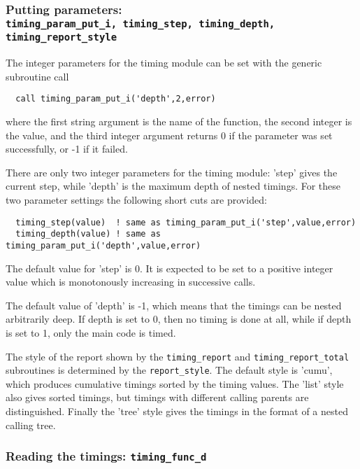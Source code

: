 \subsubsection{Putting parameters: \\
{\tt timing\_param\_put\_i, timing\_step, timing\_depth, 
timing\_report\_style}}

The integer parameters for the timing module can be set with the generic
subroutine call
\begin{verbatim}
  call timing_param_put_i('depth',2,error)
\end{verbatim}
where the first string argument is the name of the function,
the second integer is the value, and the third integer argument
returns 0 if the parameter was set successfully, or -1 if it failed.

There are only two integer parameters for the timing module:
'step' gives the current step, while 'depth' is the maximum
depth of nested timings. For these two parameter settings the 
following short cuts are provided:
{\small
\begin{verbatim}
  timing_step(value)  ! same as timing_param_put_i('step',value,error)
  timing_depth(value) ! same as timing_param_put_i('depth',value,error)
\end{verbatim}
}
The default value for 'step' is 0. It is expected to be set to
a positive integer value which is monotonously increasing in
successive calls.

The default value of 'depth' is -1, which 
means that the timings can be nested arbitrarily deep. 
If depth is set to 0, then no timing is done at all, while
if depth is set to 1, only the main code is timed.

The style of the report shown by the 
{\tt timing\_report} and  {\tt timing\_report\_total} subroutines
is determined by the {\tt report\_style}. The default style is
'cumu', which produces cumulative timings sorted by the timing values.
The 'list' style also gives sorted timings, but timings with different calling
parents are distinguished. Finally the 'tree' style gives the timings
in the format of a nested calling tree.

\subsubsection{Reading the timings: {\tt timing\_func\_d}}

